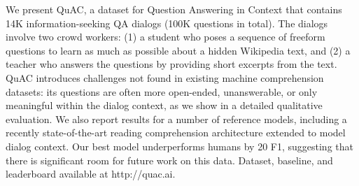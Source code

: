 We present QuAC, a dataset for Question Answering in Context that contains 14K information-seeking QA dialogs (100K questions in total). The dialogs involve two crowd workers: (1) a student who poses a sequence of freeform questions to learn as much as possible about a hidden Wikipedia text, and (2) a teacher who answers the questions by providing short excerpts from the text. QuAC introduces challenges not found in existing machine comprehension datasets: its questions are often more open-ended, unanswerable, or only meaningful within the dialog context, as we show in a detailed qualitative evaluation. We also report results for a number of reference models, including a recently state-of-the-art reading comprehension architecture extended to model dialog context. Our best model underperforms humans by 20 F1, suggesting that there is significant room for future work on this data. Dataset, baseline, and leaderboard available at http://quac.ai.
